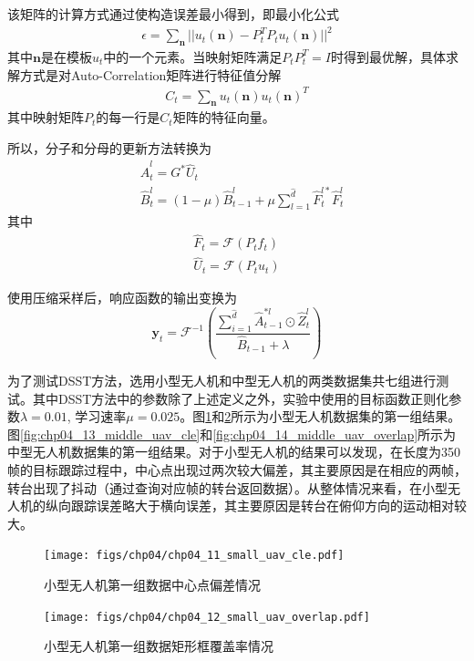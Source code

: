 该矩阵的计算方式通过使构造误差最小得到，即最小化公式
\begin{align}
\epsilon=\sum_\mathbf{n}||u_t(\mathbf{n})-P_t^TP_tu_t(\mathbf{n})||^2
\end{align}
其中$\mathbf{n}$是在模板$u_t$中的一个元素。当映射矩阵满足$P_tP_t^T=I$时得到最优解，具体求解方式是对Auto-Correlation矩阵进行特征值分解
\begin{align}
C_t=\sum_{\mathbf{n}}u_t(\mathbf{n})u_t(\mathbf{n})^T
\end{align}
其中映射矩阵$P_t$的每一行是$C_t$矩阵的特征向量。

所以，分子和分母的更新方法转换为
\begin{align}
&\hat{A}_t^l=G^*\hat{U}_t\\
&\hat{B}_t^l=(1-\mu) \hat{B}_{t-1}^{l}+\mu \sum_{l=1}^{\hat{d}}\hat{F}_t^{l*}\hat{F}^l_t
\end{align}
其中
\begin{align}
\hat{F}_t=\mathcal{F}(P_tf_t)\\
\hat{U}_t=\mathcal{F}(P_tu_t)
\end{align}

使用压缩采样后，响应函数的输出变换为
\begin{equation}
\mathbf{y}_t={\mathcal{F}^{-1}}(\frac{\sum_{i=1}^{\hat{d}}{\hat{A}^{*l}_{t-1}} \odot \hat{Z}^{l}_{t}}{\hat{B}_{t-1}+\lambda})
\end{equation}

为了测试DSST方法，选用小型无人机和中型无人机的两类数据集共七组进行测试。其中DSST方法中的参数除了上述定义之外，实验中使用的目标函数正则化参数$\lambda=0.01$, 学习速率$\mu=0.025$。图\ref{fig:chp04_11_small_uav_cle}和\ref{fig:chp04_12_small_uav_overlap}所示为小型无人机数据集的第一组结果。图\ref{fig:chp04_13_middle_uav_cle}和\ref{fig:chp04_14_middle_uav_overlap}所示为中型无人机数据集的第一组结果。对于小型无人机的结果可以发现，在长度为350帧的目标跟踪过程中，中心点出现过两次较大偏差，其主要原因是在相应的两帧，转台出现了抖动（通过查询对应帧的转台返回数据）。从整体情况来看，在小型无人机的纵向跟踪误差略大于横向误差，其主要原因是转台在俯仰方向的运动相对较大。
\begin{figure}[ht]   
	\centering
	\texttt{[image: figs/chp04/chp04\_11\_small\_uav\_cle.pdf]}
	\caption{小型无人机第一组数据中心点偏差情况}
	\label{fig:chp04_11_small_uav_cle}
\end{figure}

\begin{figure}[ht]   
	\centering
	\texttt{[image: figs/chp04/chp04\_12\_small\_uav\_overlap.pdf]}
	\caption{小型无人机第一组数据矩形框覆盖率情况}
	\label{fig:chp04_12_small_uav_overlap}
\end{figure}


